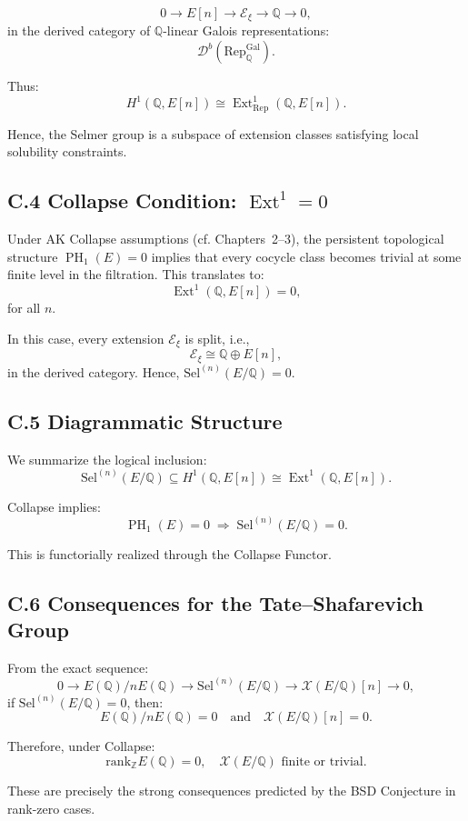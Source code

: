 \documentclass[11pt]{article}
\DeclareMathOperator{\Ext}{Ext}
\DeclareMathOperator{\PH}{PH}
\newcommand{\QQ}{\mathbb{Q}}
\newcommand{\ZZ}{\mathbb{Z}}
\newcommand{\Sha}{\mathcal{X}}
\begin{document}
\[
0 \to E[n] \to \mathcal{E}_\xi \to \QQ \to 0,
\]
in the derived category of $\QQ$-linear Galois representations:
\[
\mathcal{D}^b(\mathrm{Rep}_{\QQ}^{\text{Gal}}).
\]

Thus:
\[
H^1(\QQ,E[n]) \cong \Ext^1_{\mathrm{Rep}}(\QQ, E[n]).
\]

Hence, the Selmer group is a subspace of extension classes satisfying local solubility constraints.

\subsection*{C.4 Collapse Condition: $\Ext^1 = 0$}

Under AK Collapse assumptions (cf. Chapters~2–3), the persistent topological structure $\PH_1(E)=0$ implies that every cocycle class becomes trivial at some finite level in the filtration.  
This translates to:
\[
\Ext^1(\QQ,E[n]) = 0,
\]
for all $n$.

In this case, every extension $\mathcal{E}_\xi$ is split, i.e.,
\[
\mathcal{E}_\xi \cong \QQ \oplus E[n],
\]
in the derived category.  
Hence, $\mathrm{Sel}^{(n)}(E/\QQ) = 0$.

\subsection*{C.5 Diagrammatic Structure}

We summarize the logical inclusion:
\[
\mathrm{Sel}^{(n)}(E/\QQ) \subseteq H^1(\QQ,E[n]) \cong \Ext^1(\QQ,E[n]).
\]

Collapse implies:
\[
\PH_1(E) = 0 \;\Rightarrow\; \mathrm{Sel}^{(n)}(E/\QQ) = 0.
\]

This is functorially realized through the Collapse Functor.

\subsection*{C.6 Consequences for the Tate–Shafarevich Group}

From the exact sequence:
\[
0 \to E(\QQ)/nE(\QQ) \to \mathrm{Sel}^{(n)}(E/\QQ) \to \Sha(E/\QQ)[n] \to 0,
\]
if $\mathrm{Sel}^{(n)}(E/\QQ) = 0$, then:
\[
E(\QQ)/nE(\QQ) = 0 \quad \text{and} \quad \Sha(E/\QQ)[n] = 0.
\]

Therefore, under Collapse:
\[
\mathrm{rank}_{\ZZ} E(\QQ) = 0, \quad \Sha(E/\QQ) \text{ finite or trivial}.
\]

These are precisely the strong consequences predicted by the BSD Conjecture in rank-zero cases.
\end{document}

